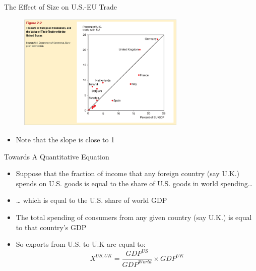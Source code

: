 \documentclass[10pt,hyperref={CJKbookmarks=true},xcolor=dvipsnames,aspectratio=169]{beamer}
\begin{document}
\begin{frame}{The Effect of Size on U.S.-EU Trade}


\begin{figure}


\centering{}\includegraphics[width=8cm]{fig/gravity/tra10}
\end{figure}

\begin{itemize}
\item Note that the slope is close to 1 
\end{itemize}
\end{frame}

\begin{frame}{Towards A Quantitative Equation}

\begin{itemize}
\item Suppose that the fraction of income that any foreign country (say
U.K.) spends on U.S. goods is equal to the share of U.S. goods in
world spending… 
\item … which is equal to the U.S. share of world GDP 
\item The total spending of consumers from any given country (say U.K.)
is equal to that country’s GDP
\item So exports from U.S. to U.K are equal to:
\[
X^{US,UK}=\frac{GDP^{US}}{GDP^{World}}\times GDP^{UK}
\]

\end{itemize}
\end{frame}
\end{document}
